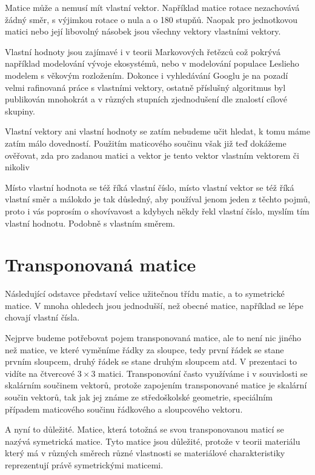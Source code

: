 \documentclass[12pt]{article}
\begin{document}
Matice může a nemusí mít vlastní vektor. Například matice rotace nezachovává žádný směr, s výjimkou rotace o nula a o 180 stupňů. Naopak pro jednotkovou matici nebo její libovolný násobek jsou všechny vektory vlastními vektory. 

Vlastní hodnoty jsou zajímavé i v teorii Markovových řetězců což pokrývá například modelování vývoje ekosystémů, nebo v modelování populace Leslieho modelem s věkovým rozložením. Dokonce i vyhledávání Googlu je na pozadí velmi rafinovaná práce s vlastními vektory, ostatně příslušný algoritmus byl publikován mnohokrát a v různých stupních zjednodušení dle znalostí cílové skupiny. 

Vlastní vektory ani vlastní hodnoty se zatím nebudeme učit hledat, k tomu máme zatím málo dovedností. Použitím maticového součinu však již teď dokážeme ověřovat, zda pro zadanou matici a vektor je tento vektor vlastním vektorem či nikoliv

Místo vlastní hodnota se též říká vlastní číslo, místo vlastní vektor se též říká vlastní směr a málokdo je tak důsledný, aby používal jenom jeden z těchto pojmů, proto i vás poprosím o shovívavost a kdybych někdy řekl vlastní číslo, myslím tím vlastní hodnotu. Podobně s vlastním směrem. 

\section*{Transponovaná matice}

Následující odstavce představí velice užitečnou třídu matic, a to symetrické matice. V mnoha ohledech jsou jednodušší, než obecné matice, například se lépe chovají vlastní čísla.

Nejprve budeme potřebovat pojem transponovaná matice, ale to není nic jiného než matice, ve které vyměníme řádky za sloupce, tedy první řádek se stane prvním sloupcem, druhý řádek se stane druhým sloupcem atd. V prezentaci to vidíte na čtvercové $3\times 3$ matici. Transponování často využíváme i v souvislosti se skalárním součinem vektorů, protože zapojením transponované matice je skalární součin vektorů, tak jak jej známe ze středoškolské geometrie, speciálním případem maticového součinu řádkového a sloupcového vektoru.

A nyní to důležité.  Matice, která totožná se svou transponovanou maticí se nazývá symetrická matice. Tyto matice jsou důležité, protože v teorii materiálu který má v různých směrech různé vlastnosti se materiálové charakteristiky reprezentují právě symetrickými maticemi.
\end{document}
